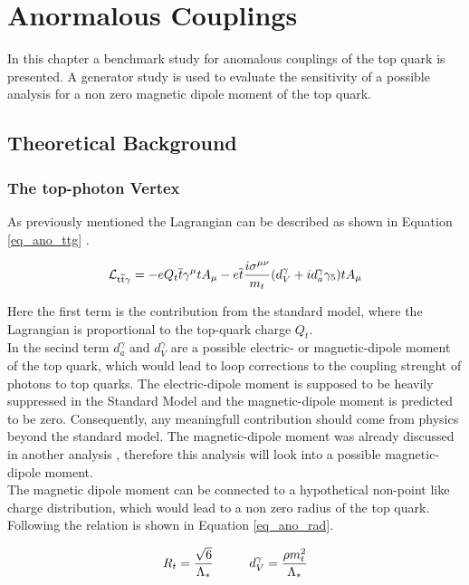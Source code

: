 \chapter{Anormalous Couplings}

In this chapter a benchmark study for anomalous couplings of the top quark is presented. A generator study is used to evaluate the sensitivity of a possible \ttgamma analysis for a non zero magnetic dipole moment of the top quark.
\section{Theoretical Background}
\subsection{The top-photon Vertex}

As previously mentioned  the \ttgamma Lagrangian can be described as shown in  Equation \ref{eq_ano_ttg} .

\begin{equation}
  \mathcal{L}_{\mathrm{t}\overline{\mathrm{t}} \gamma} = -e Q_t \overline{t} \gamma^{\mu} t A_{\mu} - e \overline{t} \frac{i \sigma^{\mu \nu}}{m_t} (d_V^{\gamma} + i d_a^{\gamma} \gamma_5) t A_{\mu}
  \label{eq_ano_ttg}
  \end{equation}

Here the first term is the contribution from the standard model, where the Lagrangian is proportional to the top-quark charge $Q_t$.\\
In the secind term $d_a^{\gamma}$ and $d_V^{\gamma}$ are a possible electric- or  magnetic-dipole moment of the top quark, which would lead to loop corrections to the coupling strenght of photons to top quarks. The electric-dipole moment is supposed to be heavily suppressed in the Standard Model  and the magnetic-dipole moment is predicted to be zero. Consequently, any meaningfull contribution should come from physics beyond the standard model. The magnetic-dipole moment was already discussed in another analysis , therefore this analysis will look into a possible magnetic-dipole moment.\\
The  magnetic dipole moment can be connected to a hypothetical non-point like charge distribution, which would lead to a non zero radius of the top quark. Following  the relation is shown in Equation \ref{eq_ano_rad}.

\begin{equation}
R_t = \frac{\sqrt{6}}{\Lambda_{\ast}} \hspace{1.cm} d_V^{\gamma} = \frac{\rho m_t^2}{\Lambda_{\ast}}
\label{eq_ano_rad}
\end{equation}

